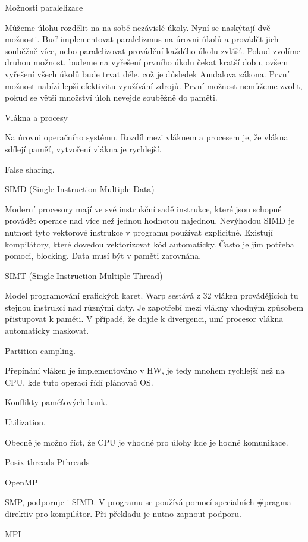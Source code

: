 Možnosti paralelizace

Můžeme úlohu rozdělit na na sobě nezávislé úkoly. Nyní se naskýtají dvě možnosti. Buď implementovat paralelizmus na úrovni úkolů a provádět jich souběžně více, nebo paralelizovat provádění každého úkolu zvlášť. Pokud zvolíme druhou možnost, budeme na vyřešení prvního úkolu čekat kratší dobu, ovšem vyřešení všech úkolů bude trvat déle, což je důsledek Amdalova zákona. První možnost nabízí lepší efektivitu využívání zdrojů. První možnost nemůžeme zvolit, pokud se větší množství úloh nevejde souběžně do paměti.

Vlákna a procesy

Na úrovni operačního systému. Rozdíl mezi vláknem a procesem je, že vlákna sdílejí paměť, vytvoření vlákna je rychlejší.

False sharing.

SIMD (Single Instruction Multiple Data)

Moderní procesory mají ve své instrukční sadě instrukce, které jsou schopné provádět operace nad více než jednou hodnotou najednou. Nevýhodou SIMD je nutnost tyto vektorové instrukce v programu používat explicitně. Existují kompilátory, které dovedou vektorizovat kód automaticky. Často je jim potřeba pomoci, blocking. Data musí být v paměti zarovnána.

SIMT (Single Instruction Multiple Thread)

Model programování grafických karet. Warp sestává z 32 vláken provádějících tu stejnou instrukci nad různými daty. Je zapotřebí mezi vlákny vhodným způsobem přistupovat k paměti. V případě, že dojde k divergenci, umí procesor vlákna automaticky maskovat.

Partition campling.

Přepínání vláken je implementováno v HW, je tedy mnohem rychlejší než na CPU, kde tuto operaci řídí plánovač OS.

Konflikty paměťových bank.

Utilization.

Obecně je možno říct, že CPU je vhodné pro úlohy kde je hodně komunikace.

Posix threads Pthreads

OpenMP

SMP, podporuje i SIMD. V programu se používá pomocí specialních \#pragma direktiv pro kompilátor. Při překladu je nutno zapnout podporu.

MPI

